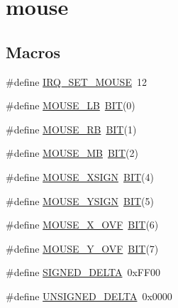 \hypertarget{group__mouse}{}\section{mouse}
\label{group__mouse}
\subsection*{Macros}
\begin{DoxyCompactItemize}
\item 
\#define \mbox{\hyperlink{group__mouse_ga76920fcbc0475dc2a9289514aed1f667}{I\+R\+Q\+\_\+\+S\+E\+T\+\_\+\+M\+O\+U\+SE}}~12
\item 
\#define \mbox{\hyperlink{group__mouse_ga81c0f94add844b0761bd142f7f708431}{M\+O\+U\+S\+E\+\_\+\+LB}}~\mbox{\hyperlink{group__uart_ga3a8ea58898cb58fc96013383d39f482c}{B\+IT}}(0)
\item 
\#define \mbox{\hyperlink{group__mouse_ga5f47c1d60579c8691054c939c1d7c20e}{M\+O\+U\+S\+E\+\_\+\+RB}}~\mbox{\hyperlink{group__uart_ga3a8ea58898cb58fc96013383d39f482c}{B\+IT}}(1)
\item 
\#define \mbox{\hyperlink{group__mouse_ga5a934eaadd3536aabe6df0adf6728e8e}{M\+O\+U\+S\+E\+\_\+\+MB}}~\mbox{\hyperlink{group__uart_ga3a8ea58898cb58fc96013383d39f482c}{B\+IT}}(2)
\item 
\#define \mbox{\hyperlink{group__mouse_gaf2b11758f02224a6ee0af9580da0ec91}{M\+O\+U\+S\+E\+\_\+\+X\+S\+I\+GN}}~\mbox{\hyperlink{group__uart_ga3a8ea58898cb58fc96013383d39f482c}{B\+IT}}(4)
\item 
\#define \mbox{\hyperlink{group__mouse_gade58ae219dbf8a1973e050873a3b15a2}{M\+O\+U\+S\+E\+\_\+\+Y\+S\+I\+GN}}~\mbox{\hyperlink{group__uart_ga3a8ea58898cb58fc96013383d39f482c}{B\+IT}}(5)
\item 
\#define \mbox{\hyperlink{group__mouse_ga0663715bb53ecaf279ac3c18906e8bc6}{M\+O\+U\+S\+E\+\_\+\+X\+\_\+\+O\+VF}}~\mbox{\hyperlink{group__uart_ga3a8ea58898cb58fc96013383d39f482c}{B\+IT}}(6)
\item 
\#define \mbox{\hyperlink{group__mouse_ga637f5d5ecc9244806ca437d9b4f88c7b}{M\+O\+U\+S\+E\+\_\+\+Y\+\_\+\+O\+VF}}~\mbox{\hyperlink{group__uart_ga3a8ea58898cb58fc96013383d39f482c}{B\+IT}}(7)
\item 
\#define \mbox{\hyperlink{group__mouse_gac103b86ffffec8aa65f4ee49c0db1ff5}{S\+I\+G\+N\+E\+D\+\_\+\+D\+E\+L\+TA}}~0x\+F\+F00
\item 
\#define \mbox{\hyperlink{group__mouse_gaf05c4d0ed0ffdac5f6becee7fc04cc3e}{U\+N\+S\+I\+G\+N\+E\+D\+\_\+\+D\+E\+L\+TA}}~0x0000
\end{DoxyCompactItemize}
